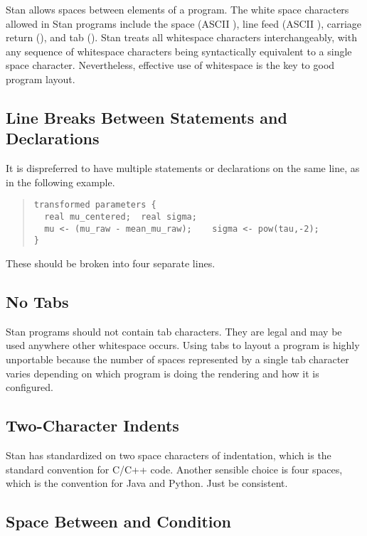 Stan allows spaces between elements of a program.  The white space
characters allowed in Stan programs include the space (ASCII
), line feed (ASCII ), carriage return
(), and tab ().  Stan treats all whitespace
characters interchangeably, with any sequence of whitespace characters
being syntactically equivalent to a single space character.
Nevertheless, effective use of whitespace is the key to good program
layout.


\subsection{Line Breaks Between Statements and Declarations}

It is dispreferred to have multiple statements or declarations on the
same line, as in the following example.
%
\begin{quote}
\begin{Verbatim}[fontsize=\small]
transformed parameters {
  real mu_centered;  real sigma;
  mu <- (mu_raw - mean_mu_raw);    sigma <- pow(tau,-2);
}
\end{Verbatim}
\end{quote}
%
These should be broken into four separate lines.

\subsection{No Tabs}

Stan programs should not contain tab characters.  They are legal and
may be used anywhere other whitespace occurs.  Using tabs to layout a
program is highly unportable because the number of spaces
represented by a single tab character varies depending on which
program is doing the rendering and how it is configured.  

\subsection{Two-Character Indents}

Stan has standardized on two space characters of indentation, which is
the standard convention for C/C++ code.  Another sensible choice is
four spaces, which is the convention for Java and Python.  Just be
consistent.  

\subsection{Space Between  and Condition}

